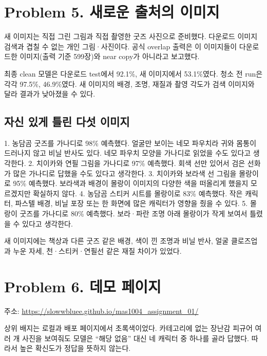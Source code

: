 \documentclass[11pt]{article}
\begin{document}
\section*{Problem 5. 새로운 출처의 이미지}

새 이미지는 직접 그린 그림과 직접 촬영한 굿즈 사진으로 준비했다.
다운로드 이미지 검색과 겹칠 수 없는 개인 그림·사진이다.
공식 overlap 출력은 이 이미지들이 다운로드한 이미지(출력 기준 599장)와 near copy가 아니라고
보고했다.


최종 clean 모델은 다운로드 test에서 92.1\%, 새 이미지에서 53.1\%였다.
청소 전 run은 각각 97.5\%, 46.9\%였다. 새 이미지의 배경, 조명, 재질과
촬영 각도가 검색 이미지와 달라 결과가 낮아졌을 수 있다.

\subsection*{자신 있게 틀린 다섯 이미지}

1. 농담곰 굿즈를 가나디로 98\% 예측했다. 얼굴만 보이는 네모 파우치라
    귀와 몸통이 드러나지 않고 비닐 반사도 있다. 네모 파우치 모양을
    가나디로 읽었을 수도 있다고 생각한다.
2. 치이카와 연필 그림을 가나디로 97\% 예측했다. 회색 선만 있어서
    검은 선화가 많은 가나디로 답했을 수도 있다고 생각한다.
3. 치이카와 보라색 선 그림을 몰랑이로 95\% 예측했다. 보라색과 배경이
    몰랑이 이미지의 다양한 색을 떠올리게 했을지 모르겠지만 확실하지 않다.
4. 농담곰 스티커 시트를 몰랑이로 83\% 예측했다. 작은 캐릭터, 파스텔
    배경, 비닐 포장 또는 한 화면에 많은 캐릭터가 영향을 줬을 수 있다.
5. 몰랑이 굿즈를 가나디로 80\% 예측했다. 보라·파란 조명 아래 몰랑이가
    작게 보여서 틀렸을 수 있다고 생각한다.

새 이미지에는 책상과 다른 굿즈 같은 배경, 색이 낀 조명과 비닐 반사,
얼굴 클로즈업과 누운 자세, 천·스티커·연필선 같은 재질 차이가 있었다.

\section*{Problem 6. 데모 페이지}

주소: \url{https://slowwbluee.github.io/mas1004_assignment_01/}

상위 배지는 로컬과 배포 페이지에서 초록색이었다. 카테고리에 없는 장난감
피규어 여러 개 사진을 보여줘도 모델은 ``해당 없음'' 대신 네 캐릭터 중
하나를 골라 답했다. 따라서 높은 확신도가 정답을 뜻하지 않는다.
\end{document}
